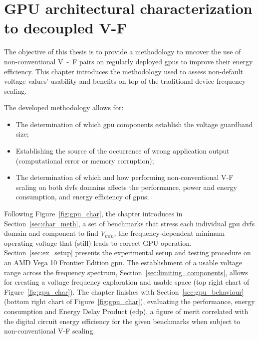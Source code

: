 
\chapter{GPU architectural characterization to decoupled V-F}
\label{chapter:gpu_char}
The objective of this thesis is to provide a methodology to uncover the use of non-conventional V~-~F pairs on regularly deployed \acrshort{gpu}s to improve their energy efficiency.
This chapter introduces the methodology used to assess non-default voltage values' usability and benefits on top of the traditional device frequency scaling. 

The developed methodology allows for:
\begin{itemize}
    \item The determination of which \acrshort{gpu} components establish the voltage guardband size;
    \item Establishing the source of the occurrence of wrong application output (computational error or memory corruption);
    \item The determination of which and how performing non-conventional V-F scaling on both \acrshort{dvfs} domains affects the performance, power and energy consumption, and energy efficiency of \acrshort{gpu}s;
\end{itemize}

Following Figure~\ref{fig:gpu_char}, the chapter introduces in Section~\ref{sec:char_meth}, a set of benchmarks that stress each individual \acrshort{gpu} \acrshort{dvfs} domain and component to find $V_{min}$, the frequency-dependent minimum operating voltage that (still) leads to correct GPU operation. Section~\ref{sec:ex_setup} presents the experimental setup and testing procedure on an AMD Vega 10 Frontier Edition \acrshort{gpu}. The establishment of a usable voltage range across the frequency spectrum, Section~\ref{sec:limiting_components}, allows for creating a voltage frequency exploration and usable space (top right chart of Figure~\ref{fig:gpu_char}). The chapter finishes with Section~\ref{sec:gpu_behaviour} (bottom right chart of Figure~\ref{fig:gpu_char}),  evaluating the performance, energy consumption and Energy Delay Product (\acrshort{edp}), a figure of merit correlated with the digital circuit energy efficiency for the given benchmarks when subject to non-conventional V-F scaling.

